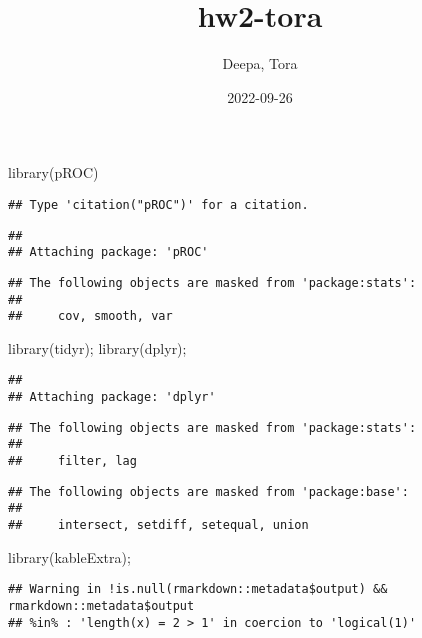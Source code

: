 \documentclass[
]{article}
\title{hw2-tora}
\author{Deepa, Tora}
\date{2022-09-26}
\newenvironment{Shaded}{\begin{snugshade}}{\end{snugshade}}
\newcommand{\FunctionTok}[1]{\textcolor[rgb]{0.00,0.00,0.00}{#1}}
\newcommand{\NormalTok}[1]{#1}
\begin{document}
\maketitle

\begin{Shaded}
\begin{Highlighting}[]
\FunctionTok{library}\NormalTok{(pROC)}
\end{Highlighting}
\end{Shaded}

\begin{verbatim}
## Type 'citation("pROC")' for a citation.
\end{verbatim}

\begin{verbatim}
## 
## Attaching package: 'pROC'
\end{verbatim}

\begin{verbatim}
## The following objects are masked from 'package:stats':
## 
##     cov, smooth, var
\end{verbatim}

\begin{Shaded}
\begin{Highlighting}[]
\FunctionTok{library}\NormalTok{(tidyr);}
\FunctionTok{library}\NormalTok{(dplyr); }
\end{Highlighting}
\end{Shaded}

\begin{verbatim}
## 
## Attaching package: 'dplyr'
\end{verbatim}

\begin{verbatim}
## The following objects are masked from 'package:stats':
## 
##     filter, lag
\end{verbatim}

\begin{verbatim}
## The following objects are masked from 'package:base':
## 
##     intersect, setdiff, setequal, union
\end{verbatim}

\begin{Shaded}
\begin{Highlighting}[]
\FunctionTok{library}\NormalTok{(kableExtra);}
\end{Highlighting}
\end{Shaded}

\begin{verbatim}
## Warning in !is.null(rmarkdown::metadata$output) && rmarkdown::metadata$output
## %in% : 'length(x) = 2 > 1' in coercion to 'logical(1)'
\end{verbatim}
\end{document}

